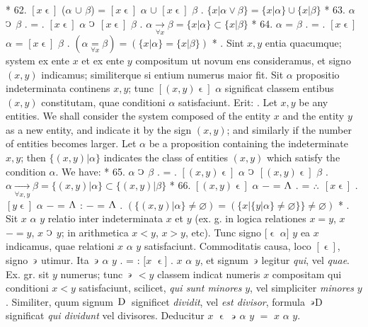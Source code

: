 \documentclass{book}
\newcommand{\C}{\mathop{\sbox0{$\displaystyle$$\reflectbox{C}$} %
\raisebox{-\height+\ht0-0.05cm}[\ht0][\dp0]{\scalebox{0.8}[0.8]{\copy0}}}\displaylimits} %
\newcommand{\pppNoSpace}{\leavevmode\lower0ex\hbox{.}\kern-0.1em\raise0.7ex\hbox{.}\kern-0.1em\lower0ex\hbox{.}} %
\newcommand{\abs}{\mathop{\rotatebox[origin=c]{180}{V}}}
\newcommand{\such}{\thinspace \rotatebox[origin=c]{180}{$\epsilon$}}
\newcommand{\smallIn}{\ensuremath{\mathrel{\epsilon}}}
\newcommand{\D}{\mathop{\thinspace \text{D} \thinspace}}
\newenvironment{translateTwoCol}
               { %
                 \columnratio{0.5, 0.5} \begin{paracol}{2}
                 \newcommand{\LAT}{\switchcolumn[0]*}
                 \newcommand{\ENG}{\switchcolumn[1]}
               }
               { %
                 \let\ENG\undefined
                 \let\LAT\undefined
                 \end{paracol}
               }
\begin{document}
\begin{translateTwoCol}
\LAT
62. \hspace{0.67cm} $[x\smallIn]$ ($\alpha$ $\cup$ $\beta$) = $[x\smallIn]$ $\alpha$ $\cup$ $[x\smallIn]$ $\beta$
\ENG
62. \hspace{0.67cm} $\{ x | \alpha \vee \beta \} = \{ x | \alpha \} \cup \{ x | \beta \}$
\LAT
63. \hspace{0.67cm} $\alpha$ $\C$\scalebox{0.7}{$x$} $\beta$ . = . $[x\smallIn]$ $\alpha$  $\C$ $[x\smallIn]$ $\beta$
\ENG
63. \hspace{0.67cm} $\alpha \xrightarrow[\forall x]{} \beta = \{x | \alpha\} \subset \{x | \beta \}$
\LAT
64. \hspace{0.67cm} $\alpha$ =\scalebox{0.7}{$x$} $\beta$ . = . $[x\smallIn]$ $\alpha$ = $[x\smallIn]$ $\beta$
\ENG
64. \hspace{0.67cm} $(\alpha \underset{\forall x}= \beta) = (\{ x |  \alpha\} = \{x | \beta \} )$
\LAT
{}. Sint $x,y$ entia quacumque; system ex ente $x$ et ex ente $y$ compositum ut novum ens consideramus, et signo $(x,y)$ indicamus; similiterque si entium numerus maior fit. Sit $\alpha$ propositio indeterminata continens $x,y$; tunc $[(x,y)\smallIn]$ $\alpha$ significat classem entibus $(x,y)$ constitutam, quae conditioni $\alpha$ satisfaciunt. Erit:
\ENG
{}. Let $x,y$ be any entities. We shall consider the system composed of the entity $x$ and the entity $y$ as a new entity, and indicate it by the sign $(x,y)$; and similarly if the number of entities becomes larger. Let $\alpha$ be a proposition containing the indeterminate $x,y$; then $\{(x,y) | \alpha \}$ indicates the class of entities $(x,y)$ which satisfy the condition $\alpha$. We have:
\LAT
65. \hspace{0.67cm} $\alpha$ $\C$\scalebox{0.7}{$x, y$} $\beta$ . = . $[(x, y)\smallIn]$ $\alpha$  $\C$ $[(x, y)\smallIn]$ $\beta$
\ENG
65. \hspace{0.67cm} $\alpha \xrightarrow[\forall x,y]{} \beta = \{(x,y) | \alpha\} \subset \{(x,y) | \beta \}$
\LAT
66. \hspace{0.67cm} $[(x, y)\smallIn]$ $\alpha$ $-$ = $\abs$ . = $\pppNoSpace$ $[x\smallIn]$ . $[y\smallIn]$ $\alpha$ $-$ = $\abs$ : $-$ = $\abs$
\ENG
66. \hspace{0.67cm} $( \{ (x,y) | \alpha \} \neq \varnothing ) = ( \{ x | \{ y | \alpha \} \neq \varnothing \} \} \neq \varnothing )$   %
\LAT
{}. Sit $x$ $\alpha$ $y$ relatio inter indeterminata $x$ et $y$ (ex. g. in logica relationes $x = y$, $x$ $- = y$, $x$ $\C$ $y$; in arithmetica $x < y$, $x > y$, etc). Tunc signo $[\smallIn$ $\alpha]$ $y$ ea $x$ indicamus, quae relationi $x$ $\alpha$ $y$ satisfaciunt. Commoditatis causa, loco $[\smallIn]$, signo $\such$ utimur. Ita $\such$ $\alpha$ $y$ . = : $[x$ $\smallIn ]$ . $x$ $\alpha$ $y$, et signum $\such$ legitur \emph{qui}, vel \emph{quae}. Ex. gr. sit $y$ numerus; tunc $\such$ $< y$ classem indicat numeris $x$ compositam qui conditioni $x<y$ satisfaciunt, scilicet, \emph{qui sunt minores} $y$, vel simpliciter \emph{minores} $y$. Similiter, quum signum $\D$ significet \emph{dividit}, vel \emph{est divisor}, formula $\such$D significat \emph{qui dividunt} vel {divisores}. Deducitur $x$ $\smallIn$ $\such$ $\alpha$ $y$ $=$ $x$ $\alpha$ $y$.

\end{translateTwoCol}
\end{document}
